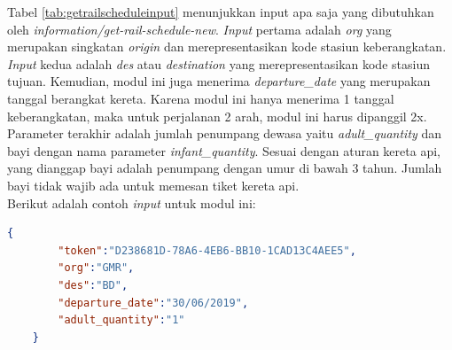 Tabel \ref{tab:getrailscheduleinput} menunjukkan input apa saja yang dibutuhkan oleh \textit{information/get-rail-schedule-new}. \textit{Input} pertama adalah \textit{org} yang merupakan singkatan \textit{origin} dan merepresentasikan kode stasiun keberangkatan. \textit{Input} kedua adalah \textit{des} atau \textit{destination} yang merepresentasikan kode stasiun tujuan. Kemudian, modul ini juga menerima \textit{departure\_date} yang merupakan tanggal berangkat kereta. Karena modul ini hanya menerima 1 tanggal keberangkatan, maka untuk perjalanan 2 arah, modul ini harus dipanggil 2x. Parameter terakhir adalah jumlah penumpang dewasa yaitu \textit{adult\_quantity} dan bayi dengan nama parameter \textit{infant\_quantity}. Sesuai dengan aturan kereta api, yang dianggap bayi adalah penumpang dengan umur di bawah 3 tahun. Jumlah bayi tidak wajib ada untuk memesan tiket kereta api.\\

Berikut adalah contoh \textit{input} untuk modul ini:

\begin{lstlisting}[language=json]
    {
        "token":"D238681D-78A6-4EB6-BB10-1CAD13C4AEE5",
        "org":"GMR",
        "des":"BD",
        "departure_date":"30/06/2019",
        "adult_quantity":"1"
    }
\end{lstlisting}

